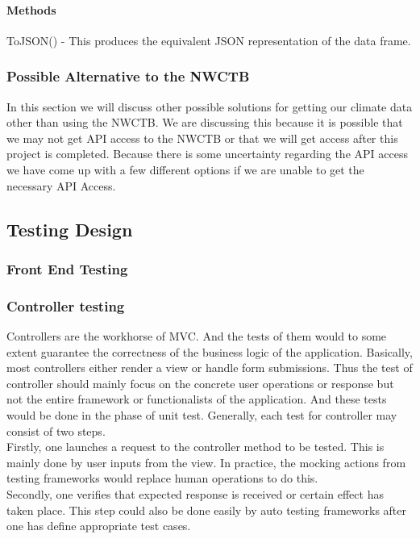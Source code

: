 \documentclass[onecolumn, draftclsnofoot,10pt, compsoc]{article}
\begin{document}
			\paragraph{\textbf{Methods}}
			ToJSON() - This produces the equivalent JSON representation of the data frame.\\
			

			\subsubsection{Possible Alternative to the NWCTB}
				In this section we will discuss other possible solutions for getting our climate data other than using the NWCTB. We are discussing this because it is possible that we may not get API access to the NWCTB or that we will get access after this project is completed. Because there is some uncertainty regarding the API access we have come up with a few different options if we are unable to get the necessary API Access.\\
				
	\subsection{Testing Design}
		\subsubsection{Front End Testing}

		\subsubsection{Controller testing}
		Controllers are the workhorse of MVC. And the tests of them would to some extent guarantee the correctness of the business logic of the application. Basically, most controllers either render a view or handle form submissions. Thus the test of controller should mainly focus on the concrete user operations or response but not the entire framework or functionalists of the application. And these tests would be done in the phase of unit test. Generally, each test for controller may consist of two steps. \\
Firstly, one launches a request to the controller method to be tested. This is mainly done by user inputs from the view. In practice, the mocking actions from testing frameworks would replace human operations to do this.\\
Secondly, one verifies that expected response is received or certain effect has taken place. This step could also be done easily by auto testing frameworks after one has define appropriate test cases.\\
\end{document}
